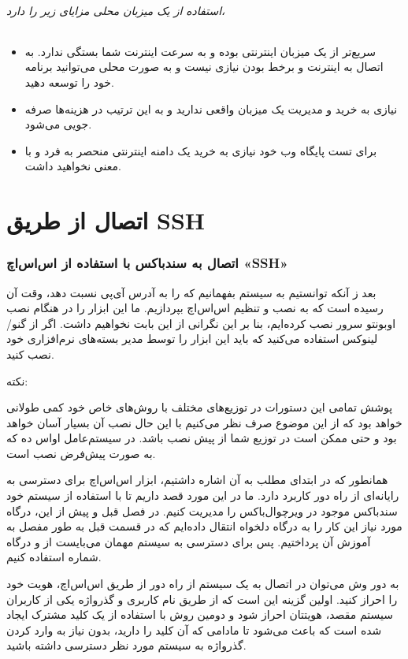 \paragraph{استفاده از یک میزبان محلی مزایای زیر را دارد،}
\begin{itemize}
    \item
    سریع‌تر از یک میزبان اینترنتی بوده و به سرعت اینترنت شما بستگی ندارد.
    به اتصال به اینترنت و برخط بودن نیازی نیست و به صورت محلی می‌توانید برنامه خود را توسعه دهید.
    \item
    نیازی به خرید و مدیریت یک میزبان واقعی ندارید و به این ترتیب در هزینه‌ها صرفه جویی می‌شود.
    \item
    برای تست پایگاه وب خود نیازی به خرید یک دامنه اینترنتی منحصر به فرد و با معنی نخواهید داشت.
    
\end{itemize}

\part*{اتصال از طریق SSH}
\section{اتصال به سندباکس با استفاده از اس‌اس‌اچ «SSH»}
بعد ز آنکه توانستیم به سیستم بفهمانیم که 
 را به آدرس آی‌پی 
 نسبت دهد، وقت آن رسیده است که به نصب و تنظیم اس‌اس‌اچ بپردازیم. ما این ابزار را در هنگام نصب اوبونتو سرور نصب کرده‌ایم، بنا بر این نگرانی از این بابت نخواهیم داشت. اگر از گنو/لینوکس استفاده می‌کنید که باید این ابزار را توسط مدیر بسته‌های نرم‌افزاری خود نصب کنید.

\subparagraph*{نکته: }
پوشش تمامی این دستورات در توزیع‌های مختلف با روش‌های خاص خود کمی طولانی خواهد بود که از این موضوع صرف نظر می‌کنیم با این حال نصب آن بسیار آسان خواهد بود و حتی ممکن است در توزیع شما از پیش نصب باشد. در سیستم‌عامل او‌اس ده که به صورت پیش‌فرض نصب است.

همانطور که در ابتدای مطلب به آن اشاره داشتیم، ابزار اس‌اس‌اچ برای دسترسی به رایانه‌ای از راه دور کاربرد دارد. ما در این مورد قصد داریم تا با استفاده از سیستم خود سندباکس موجود در ویرچوال‌باکس را مدیریت کنیم. در فصل قبل و پیش از این، درگاه مورد نیاز این کار را به درگاه دلخواه 
 انتقال داده‌ایم که در قسمت قبل به طور مفصل به آموزش آن پرداختیم. پس برای دسترسی به سیستم مهمان می‌بایست از 
 و درگاه شماره 
  استفاده کنیم.

به دور وش می‌توان در اتصال به یک سیستم از راه دور از طریق اس‌اس‌اچ، هویت خود را احراز کنید. اولین گزینه این است که  از طریق نام کاربری و گذرواژه یکی از کاربران سیستم مقصد، هویتتان احراز شود و دومین روش با استفاده از یک کلید مشترک ایجاد شده است که باعث می‌شود تا مادامی که آن کلید را دارید، بدون نیاز به وارد کردن گذرواژه به سیستم مورد نظر دسترسی داشته باشید.

